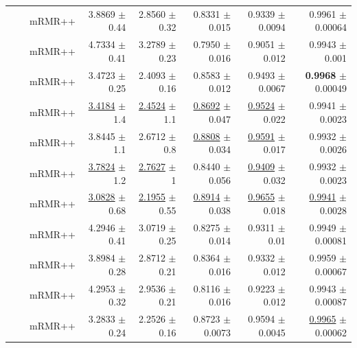 \begin{longtable}{llp{}rrrrr}
 &  & mRMR++ & 3.8869 {\scriptsize $\pm$ 0.44} & 2.8560 {\scriptsize $\pm$ 0.32} & 0.8331 {\scriptsize $\pm$ 0.015} & 0.9339 {\scriptsize $\pm$ 0.0094} & 0.9961 {\scriptsize $\pm$ 0.00064} \\
 &  & mRMR++ & 4.7334 {\scriptsize $\pm$ 0.41} & 3.2789 {\scriptsize $\pm$ 0.23} & 0.7950 {\scriptsize $\pm$ 0.016} & 0.9051 {\scriptsize $\pm$ 0.012} & 0.9943 {\scriptsize $\pm$ 0.001} \\
 &  & mRMR++ & 3.4723 {\scriptsize $\pm$ 0.25} & 2.4093 {\scriptsize $\pm$ 0.16} & 0.8583 {\scriptsize $\pm$ 0.012} & 0.9493 {\scriptsize $\pm$ 0.0067} & \textbf{0.9968} {\scriptsize $\pm$ 0.00049} \\
 &  & mRMR++ & \underline{3.4184} {\scriptsize $\pm$ 1.4} & \underline{2.4524} {\scriptsize $\pm$ 1.1} & \underline{0.8692} {\scriptsize $\pm$ 0.047} & \underline{0.9524} {\scriptsize $\pm$ 0.022} & 0.9941 {\scriptsize $\pm$ 0.0023} \\
 &  & mRMR++ & 3.8445 {\scriptsize $\pm$ 1.1} & 2.6712 {\scriptsize $\pm$ 0.8} & \underline{0.8808} {\scriptsize $\pm$ 0.034} & \underline{0.9591} {\scriptsize $\pm$ 0.017} & 0.9932 {\scriptsize $\pm$ 0.0026} \\
 &  & mRMR++ & \underline{3.7824} {\scriptsize $\pm$ 1.2} & \underline{2.7627} {\scriptsize $\pm$ 1} & 0.8440 {\scriptsize $\pm$ 0.056} & \underline{0.9409} {\scriptsize $\pm$ 0.032} & 0.9932 {\scriptsize $\pm$ 0.0023} \\
 &  & mRMR++ & \underline{3.0828} {\scriptsize $\pm$ 0.68} & \underline{2.1955} {\scriptsize $\pm$ 0.55} & \underline{0.8914} {\scriptsize $\pm$ 0.038} & \underline{0.9655} {\scriptsize $\pm$ 0.018} & \underline{0.9941} {\scriptsize $\pm$ 0.0028} \\
 &  & mRMR++ & 4.2946 {\scriptsize $\pm$ 0.41} & 3.0719 {\scriptsize $\pm$ 0.25} & 0.8275 {\scriptsize $\pm$ 0.014} & 0.9311 {\scriptsize $\pm$ 0.01} & 0.9949 {\scriptsize $\pm$ 0.00081} \\
 &  & mRMR++ & 3.8984 {\scriptsize $\pm$ 0.28} & 2.8712 {\scriptsize $\pm$ 0.21} & 0.8364 {\scriptsize $\pm$ 0.016} & 0.9332 {\scriptsize $\pm$ 0.012} & 0.9959 {\scriptsize $\pm$ 0.00067} \\
 &  & mRMR++ & 4.2953 {\scriptsize $\pm$ 0.32} & 2.9536 {\scriptsize $\pm$ 0.21} & 0.8116 {\scriptsize $\pm$ 0.016} & 0.9223 {\scriptsize $\pm$ 0.012} & 0.9943 {\scriptsize $\pm$ 0.00087} \\
 &  & mRMR++ & 3.2833 {\scriptsize $\pm$ 0.24} & 2.2526 {\scriptsize $\pm$ 0.16} & 0.8723 {\scriptsize $\pm$ 0.0073} & 0.9594 {\scriptsize $\pm$ 0.0045} & \underline{0.9965} {\scriptsize $\pm$ 0.00062} \\

\end{longtable}
